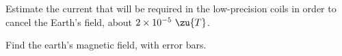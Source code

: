 \prelabquestion Estimate the current that will be required in the low-precision coils in order
to cancel the Earth's field, about $2\times10^{-5}\ \zu{T}$.

\analysis

Find the earth's magnetic field, with error bars.


